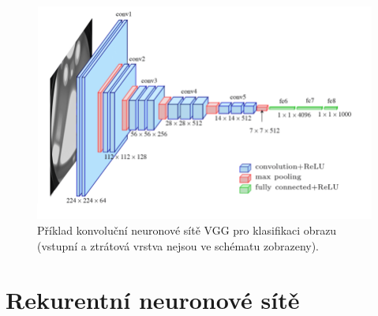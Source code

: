 \begin{figure}[H]
    \centering
    \includegraphics[width=1\linewidth]{vgg.png}
    \caption{Příklad konvoluční neuronové sítě VGG pro klasifikaci obrazu (vstupní a ztrátová vrstva nejsou ve schématu zobrazeny).}
\end{figure}


\section{Rekurentní neuronové sítě}


